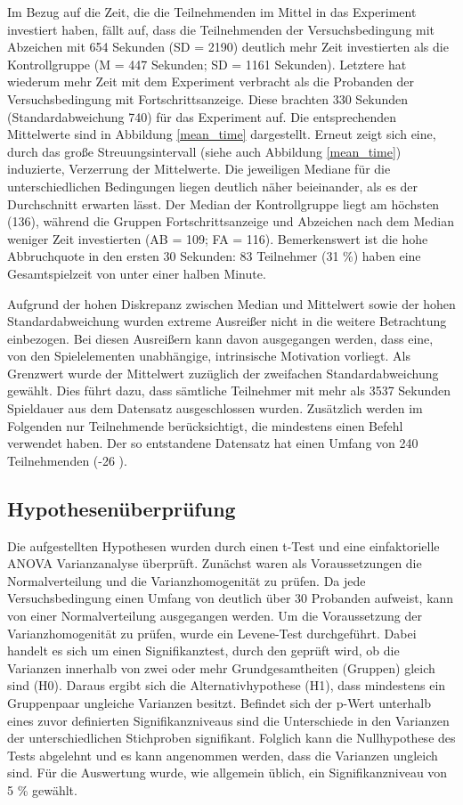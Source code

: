 Im Bezug auf die Zeit, die die Teilnehmenden im Mittel in das Experiment investiert haben, fällt auf, dass die Teilnehmenden der Versuchsbedingung mit Abzeichen mit 654 Sekunden (SD = 2190) deutlich mehr Zeit investierten als die Kontrollgruppe (M = 447 Sekunden; SD = 1161 Sekunden). Letztere hat wiederum mehr Zeit mit dem Experiment verbracht als die Probanden der Versuchsbedingung mit Fortschrittsanzeige. Diese brachten 330 Sekunden (Standardabweichung 740) für das Experiment auf. Die entsprechenden Mittelwerte sind in Abbildung \ref{mean_time} dargestellt. Erneut zeigt sich eine, durch das große Streuungsintervall (siehe auch Abbildung \ref{mean_time}) induzierte, Verzerrung der Mittelwerte. Die jeweiligen Mediane für die unterschiedlichen Bedingungen liegen deutlich näher beieinander, als es der Durchschnitt erwarten lässt. Der Median der Kontrollgruppe liegt am höchsten (136), während die Gruppen Fortschrittsanzeige und Abzeichen nach dem Median weniger Zeit investierten (AB = 109; FA = 116). Bemerkenswert ist die hohe Abbruchquote in den ersten 30 Sekunden: 83 Teilnehmer (31 \%) haben eine Gesamtspielzeit von unter einer halben Minute.

Aufgrund der hohen Diskrepanz zwischen Median und Mittelwert sowie der hohen Standardabweichung wurden extreme Ausreißer nicht in die weitere Betrachtung einbezogen. Bei diesen Ausreißern kann davon ausgegangen werden, dass eine, von den Spielelementen unabhängige, intrinsische Motivation vorliegt. Als Grenzwert wurde der Mittelwert zuzüglich der zweifachen Standardabweichung gewählt. Dies führt dazu, dass sämtliche Teilnehmer mit mehr als 3537 Sekunden Spieldauer aus dem Datensatz ausgeschlossen wurden. Zusätzlich werden im Folgenden nur Teilnehmende berücksichtigt, die mindestens einen Befehl verwendet haben. Der so entstandene Datensatz hat einen Umfang von 240 Teilnehmenden (-26 ).

\subsection{Hypothesenüberprüfung}\label{hypo}
Die aufgestellten Hypothesen wurden durch einen t-Test und eine einfaktorielle  ANOVA  Varianzanalyse überprüft. Zunächst waren als Voraussetzungen die Normalverteilung und die Varianzhomogenität zu prüfen. Da jede Versuchsbedingung einen Umfang von deutlich über 30 Probanden aufweist, kann von einer Normalverteilung ausgegangen werden. Um die Voraussetzung der Varianzhomogenität zu prüfen, wurde ein Levene-Test durchgeführt. Dabei handelt es sich um einen Signifikanztest, durch den geprüft wird, ob die Varianzen innerhalb von zwei oder mehr Grundgesamtheiten (Gruppen) gleich sind (H0). Daraus ergibt sich die Alternativhypothese (H1), dass mindestens ein Gruppenpaar ungleiche Varianzen besitzt. Befindet sich der p-Wert unterhalb  eines zuvor definierten Signifikanzniveaus sind die Unterschiede in den Varianzen der unterschiedlichen Stichproben signifikant. Folglich kann die Nullhypothese des Tests abgelehnt und es kann angenommen werden, dass die Varianzen ungleich sind. Für die Auswertung wurde, wie allgemein üblich, ein Signifikanzniveau von 5 \% gewählt.

